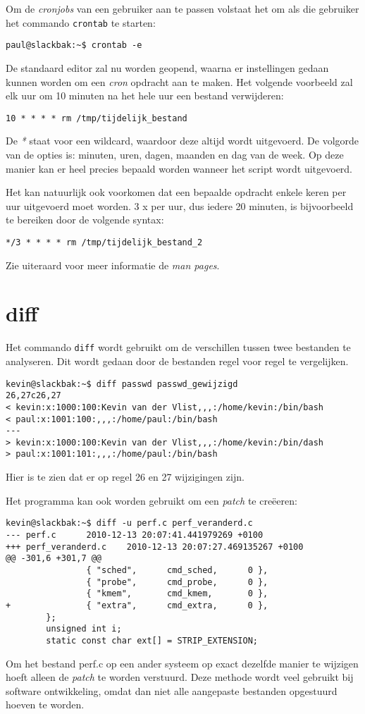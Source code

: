 Om de \emph{cronjobs} van een gebruiker aan te passen volstaat het om als die gebruiker het commando \texttt{crontab} te starten:
\begin{lstlisting}
paul@slackbak:~$ crontab -e
\end{lstlisting}%
De standaard editor zal nu worden geopend, waarna er instellingen gedaan kunnen worden om een \emph{cron} opdracht aan te maken. Het volgende voorbeeld zal elk uur om 10 minuten na het hele uur een bestand verwijderen:
\begin{lstlisting}
10 * * * * rm /tmp/tijdelijk_bestand
\end{lstlisting}
De \emph{*} staat voor een wildcard, waardoor deze altijd wordt uitgevoerd. De volgorde van de opties is: minuten, uren, dagen, maanden en dag van de week. Op deze manier kan er heel precies bepaald worden wanneer het script wordt uitgevoerd. 

Het kan natuurlijk ook voorkomen dat een bepaalde opdracht enkele keren per uur uitgevoerd moet worden. 3 x per uur, dus iedere 20 minuten, is bijvoorbeeld te bereiken door de volgende syntax:
\begin{lstlisting}
*/3 * * * * rm /tmp/tijdelijk_bestand_2
\end{lstlisting}

Zie uiteraard voor meer informatie de \emph{man pages}.

\section{diff}
Het commando \texttt{diff} wordt gebruikt om de verschillen tussen twee bestanden te analyseren. Dit wordt gedaan door de bestanden regel voor regel te vergelijken. 
\begin{lstlisting}
kevin@slackbak:~$ diff passwd passwd_gewijzigd
26,27c26,27
< kevin:x:1000:100:Kevin van der Vlist,,,:/home/kevin:/bin/bash
< paul:x:1001:100:,,,:/home/paul:/bin/bash
---
> kevin:x:1000:100:Kevin van der Vlist,,,:/home/kevin:/bin/dash
> paul:x:1001:101:,,,:/home/paul:/bin/bash
\end{lstlisting}%
Hier is te zien dat er op regel 26 en 27 wijzigingen zijn. 

Het programma kan ook worden gebruikt om een \emph{patch} te cre\"{e}eren: 
\begin{lstlisting}
kevin@slackbak:~$ diff -u perf.c perf_veranderd.c 
--- perf.c      2010-12-13 20:07:41.441979269 +0100
+++ perf_veranderd.c    2010-12-13 20:07:27.469135267 +0100
@@ -301,6 +301,7 @@
                { "sched",      cmd_sched,      0 },
                { "probe",      cmd_probe,      0 },
                { "kmem",       cmd_kmem,       0 },
+               { "extra",      cmd_extra,      0 },
        };
        unsigned int i;
        static const char ext[] = STRIP_EXTENSION;
\end{lstlisting}%
Om het bestand perf.c op een ander systeem op exact dezelfde manier te wijzigen hoeft alleen de \emph{patch} te worden verstuurd. Deze methode wordt veel gebruikt bij software ontwikkeling, omdat dan niet alle aangepaste bestanden opgestuurd hoeven te worden. 

